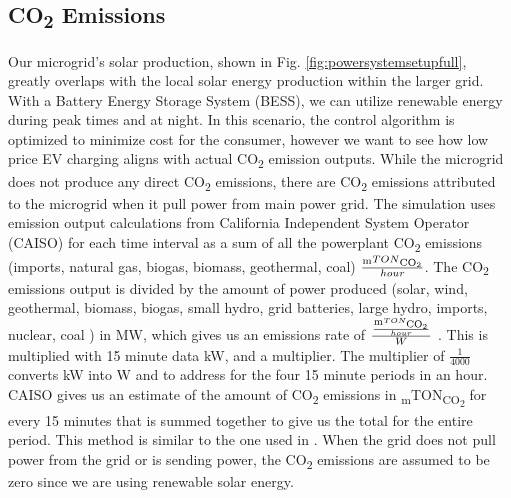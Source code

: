 \documentclass[conference]{IEEEtran}
\begin{document}
    \subsection{CO\textsubscript{2} Emissions}
        	Our microgrid's solar production, shown in Fig. \ref{fig:powersystemsetupfull}, greatly overlaps with the local solar energy production within the larger grid.  With a Battery Energy Storage System (BESS), we can utilize renewable energy during peak times and at night. In this scenario, the control algorithm is optimized to minimize cost for the consumer, however we want to see how low price EV charging aligns with actual CO\textsubscript{2} emission outputs.  While the microgrid does not produce any direct CO\textsubscript{2} emissions, there are CO\textsubscript{2} emissions attributed to the microgrid when it pull power from main power grid.  The simulation uses emission output calculations from California Independent System Operator (CAISO) for each time interval as a sum of all the powerplant CO\textsubscript{2} emissions (imports, natural gas, biogas, biomass, geothermal, coal) $\frac{\textsubscript{m}TON\textsubscript{CO\textsubscript{2}}}{hour}$. The CO\textsubscript{2} emissions output is divided by the amount of power produced (solar, wind, geothermal, biomass, biogas, small hydro, grid batteries, large hydro, imports, nuclear, coal ) in MW, which gives us an emissions rate of $\frac{\frac{\textsubscript{m}TON\textsubscript{CO\textsubscript{2}}}{hour}}{W}$ . This is multiplied with 15 minute data kW, and a multiplier. The multiplier of  $\frac{1}{4000}$ converts kW into W and to address for the four 15 minute periods in an hour. CAISO gives us an estimate of the amount of CO\textsubscript{2} emissions in \textsubscript{m}TON\textsubscript{CO\textsubscript{2}} for every 15 minutes that is summed together to give us the total for the entire period.  This method is similar to the one used in \cite{garrido2021dynamic}.  When the grid does not pull power from the grid or is sending power, the CO\textsubscript{2} emissions are assumed to be zero since we are using renewable solar energy.
\end{document}
